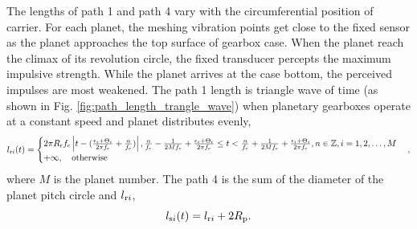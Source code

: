 \documentclass[a4paper,fleqn]{cas-sc}%
\begin{document}
\par The lengths of path 1 and path 4 vary with the circumferential position of carrier. For each planet, the meshing vibration points get close to the fixed sensor as the planet approaches the top surface of gearbox case. When the planet reach the climax of its revolution circle, the fixed transducer percepts the maximum impulsive strength. While the planet arrives at the case bottom, the perceived impulses are most weakened. The path 1 length is triangle wave of time (as shown in Fig. \ref{fig:path_length_trangle_wave}) when planetary gearboxes operate at a constant speed and planet distributes evenly, 
\begin{equation}
    l_{{\rm r}i}(t)=
    \begin{cases}
        2 \pi R_{\rm r} f_{\rm c} \left|t-(\frac{\epsilon_i+\Theta_i}{2 \pi f_{\rm c}} + \frac{n}{f_{\rm c}}) \right|, \frac{n}{f_{\rm c}} - \frac{1}{2 M f_{\rm c}} + \frac{\epsilon_i+\Theta_i}{2\pi  f_{\rm c}} \leq t < \frac{n}{f_{\rm c}} + \frac{1}{2 M f_{\rm c}} + \frac{\epsilon_i+\Theta_i}{2\pi f_{\rm c}}, n\in \mathbb{Z} , i=1,2,\ldots,M\\
        +\infty, \quad \text{otherwise}
    \end{cases},
\end{equation}
where $M$ is the planet number. The path 4 is the sum of the diameter of the planet pitch circle and $l_{{\rm r}i}$,
\begin{equation}
    l_{{\rm s}i}(t)=l_{{\rm r}i}+2 R_{\rm p}. \label{eq:path_4_length}
\end{equation}
\end{document}
